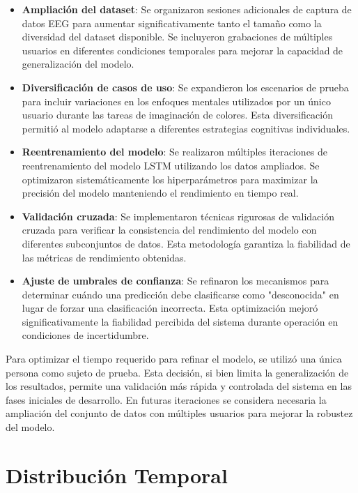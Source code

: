 \begin{itemize}
    \item \textbf{Ampliación del dataset}: Se organizaron sesiones adicionales de captura de datos EEG para aumentar significativamente tanto el tamaño como la diversidad del dataset disponible. Se incluyeron grabaciones de múltiples usuarios en diferentes condiciones temporales para mejorar la capacidad de generalización del modelo.
    
    \item \textbf{Diversificación de casos de uso}: Se expandieron los escenarios de prueba para incluir variaciones en los enfoques mentales utilizados por un único usuario durante las tareas de imaginación de colores. Esta diversificación permitió al modelo adaptarse a diferentes estrategias cognitivas individuales.
    
    \item \textbf{Reentrenamiento del modelo}: Se realizaron múltiples iteraciones de reentrenamiento del modelo LSTM utilizando los datos ampliados. Se optimizaron sistemáticamente los hiperparámetros para maximizar la precisión del modelo manteniendo el rendimiento en tiempo real.
    
    \item \textbf{Validación cruzada}: Se implementaron técnicas rigurosas de validación cruzada para verificar la consistencia del rendimiento del modelo con diferentes subconjuntos de datos. Esta metodología garantiza la fiabilidad de las métricas de rendimiento obtenidas.
    
    \item \textbf{Ajuste de umbrales de confianza}: Se refinaron los mecanismos para determinar cuándo una predicción debe clasificarse como "desconocida" en lugar de forzar una clasificación incorrecta. Esta optimización mejoró significativamente la fiabilidad percibida del sistema durante operación en condiciones de incertidumbre.
\end{itemize}

Para optimizar el tiempo requerido para refinar el modelo, se utilizó una única persona como sujeto de prueba. Esta decisión, si bien limita la generalización de los resultados, permite una validación más rápida y controlada del sistema en las fases iniciales de desarrollo. En futuras iteraciones se considera necesaria la ampliación del conjunto de datos con múltiples usuarios para mejorar la robustez del modelo.

\section{Distribución Temporal}

